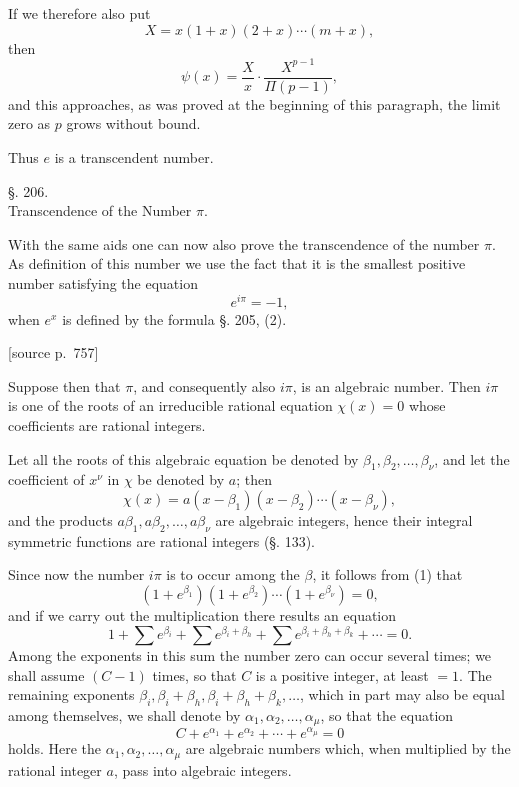 \documentclass[11pt]{article}
\newcommand{\srcpage}[1]{\par\medskip\noindent\textsf{[source p.~#1]}\par\smallskip}
\begin{document}
If we therefore also put
\[
X=x(1+x)(2+x)\cdots(m+x),
\]
then
\begin{equation}\tag{18}
\psi(x)=\frac{X}{x}\cdot\frac{X^{p-1}}{\Pi(p-1)},
\end{equation}
and this approaches, as was proved at the beginning of this paragraph, the limit zero as $p$ grows without bound.

Thus $e$ is a transcendent number.

\begin{center}
{\large §. 206.}\\[0.4em]
{\large Transcendence of the Number $\pi$.}
\end{center}

With the same aids one can now also prove the transcendence of the number $\pi$. As definition of this number we use the fact that it is the smallest positive number satisfying the equation
\begin{equation}\tag{1}
e^{i\pi}=-1,
\end{equation}
when $e^x$ is defined by the formula §. 205, (2).

\srcpage{757}
Suppose then that $\pi$, and consequently also $i\pi$, is an algebraic number. Then $i\pi$ is one of the roots of an irreducible rational equation $\chi(x)=0$ whose coefficients are rational integers.

Let all the roots of this algebraic equation be denoted by $\beta_1,\beta_2,\ldots,\beta_\nu$, and let the coefficient of $x^\nu$ in $\chi$ be denoted by $a$; then
\begin{equation}\tag{2}
\chi(x)=a(x-\beta_1)(x-\beta_2)\cdots(x-\beta_\nu),
\end{equation}
and the products $a\beta_1,a\beta_2,\ldots,a\beta_\nu$ are algebraic integers, hence their integral symmetric functions are rational integers (§. 133).

Since now the number $i\pi$ is to occur among the $\beta$, it follows from (1) that
\[
(1+e^{\beta_1})(1+e^{\beta_2})\cdots(1+e^{\beta_\nu})=0,
\]
and if we carry out the multiplication there results an equation
\[
1+\sum e^{\beta_i}+\sum e^{\beta_i+\beta_h}
+\sum e^{\beta_i+\beta_h+\beta_k}+\cdots=0.
\]
Among the exponents in this sum the number zero can occur several times; we shall assume $(C-1)$ times, so that $C$ is a positive integer, at least $=1$. The remaining exponents $\beta_i,\beta_i+\beta_h,\beta_i+\beta_h+\beta_k,\ldots$, which in part may also be equal among themselves, we shall denote by $\alpha_1,\alpha_2,\ldots,\alpha_\mu$, so that the equation
\begin{equation}\tag{3}
C+e^{\alpha_1}+e^{\alpha_2}+\cdots+e^{\alpha_\mu}=0
\end{equation}
holds. Here the $\alpha_1,\alpha_2,\ldots,\alpha_\mu$ are algebraic numbers which, when multiplied by the rational integer $a$, pass into algebraic integers.
\end{document}
